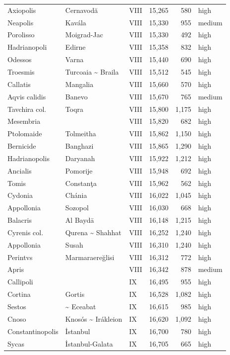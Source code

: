 \documentclass[11pt,a4paper]{article}
\begin{document}
{\begin{longtable}{p{4.6cm}p{5.2cm}lrrl}
Axiopolis & Cernavodă & VIII & 15,265 & 580 & high\\
Neapolis & Kavála & VIII & 15,330 & 955 & medium\\
Porolisso & Moigrad-Jac & VIII & 15,330 & 492 & high\\
Hadrianopoli & Edirne & VIII & 15,358 & 832 & high\\
Odessos & Varna & VIII & 15,440 & 690 & high\\
Troesmis & Turcoaia \textasciitilde{} Braila & VIII & 15,512 & 545 & high\\
Callatis & Mangalia & VIII & 15,660 & 570 & high\\
Aqvis calidis & Banevo & VIII & 15,670 & 765 & medium\\
Tavchira col. & Toqra & VIII & 15,800 & 1,175 & high\\
Mesembria &  & VIII & 15,820 & 682 & high\\
Ptolomaide & Tolmeitha & VIII & 15,862 & 1,150 & high\\
Bernicide & Banghazi & VIII & 15,865 & 1,290 & high\\
Hadrianopolis & Daryanah & VIII & 15,922 & 1,212 & high\\
Ancialis & Pomorije & VIII & 15,948 & 692 & high\\
Tomis & Constanţa & VIII & 15,962 & 562 & high\\
Cydonia & Chánia & VIII & 16,022 & 1,045 & high\\
Appollonia & Sozopol & VIII & 16,030 & 668 & high\\
Balacris & Al Baydā & VIII & 16,148 & 1,215 & high\\
Cyrenis col. & Qurena \textasciitilde{} Shahhat & VIII & 16,252 & 1,240 & high\\
Appollonia & Susah & VIII & 16,310 & 1,240 & high\\
Perintvs & Marmaraereğlisi & VIII & 16,312 & 772 & high\\
Apris &  & VIII & 16,342 & 878 & medium\\
Callipoli &  & IX & 16,495 & 955 & high\\
Cortina & Gortis & IX & 16,528 & 1,082 & high\\
Sestos & \textasciitilde{} Eceabat & IX & 16,615 & 985 & high\\
Cnoso & Knosós \textasciitilde{} Irákleion & IX & 16,620 & 1,092 & high\\
Constantinopolis & İstanbul & IX & 16,700 & 780 & high\\
Sycas & İstanbul-Galata & IX & 16,705 & 665 & high\\

\end{longtable}}
\end{document}

